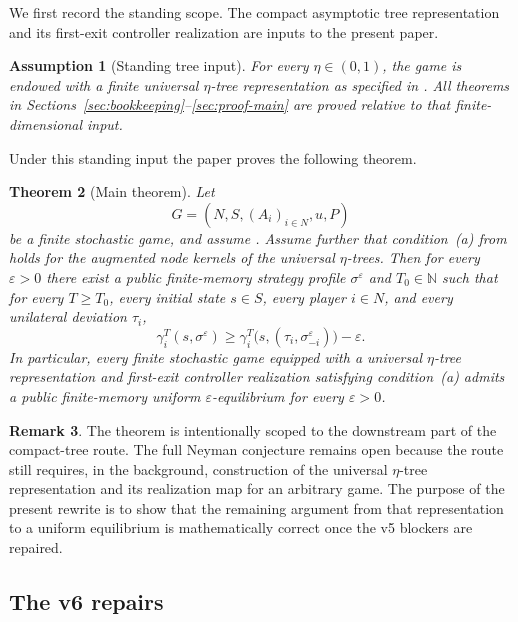 \documentclass[12pt]{article}
\newtheorem{theorem}{Theorem}[section]
\newtheorem{assumption}[theorem]{Assumption}
\theoremstyle{definition}
\newtheorem{remark}[theorem]{Remark}
\newcommand{\eps}{\varepsilon}
\newcommand{\N}{\mathbb{N}}
\newcommand{\1}{\mathbf{1}}
\begin{document}
We first record the standing scope. The compact asymptotic tree representation and
its first-exit controller realization are inputs to the present paper.

\begin{assumption}[Standing tree input]
\label{ass:tree-input}
For every $\eta\in(0,1)$, the game is endowed with a finite universal
$\eta$-tree representation as specified in
. All theorems in
Sections~\ref{sec:bookkeeping}--\ref{sec:proof-main} are proved relative to that
finite-dimensional input.
\end{assumption}

Under this standing input the paper proves the following theorem.

\begin{theorem}[Main theorem]
\label{thm:main}
Let
\[
G=(N,S,(A_i)_{i\in N},u,P)
\]
be a finite stochastic game, and assume . Assume further
that condition~\textnormal{(a)} from  holds for the augmented node
kernels of the universal $\eta$-trees. Then for every $\eps>0$ there exist a
public finite-memory strategy profile $\sigma^\eps$ and $T_0\in\N$ such that for
every $T\ge T_0$, every initial state $s\in S$, every player $i\in N$, and every
unilateral deviation $\tau_i$,
\[
\gamma_i^T(s,\sigma^\eps)
\ge
\gamma_i^T\bigl(s,(\tau_i,\sigma^\eps_{-i})\bigr)-\eps.
\]
In particular, every finite stochastic game equipped with a universal
$\eta$-tree representation and first-exit controller realization satisfying
condition~\textnormal{(a)} admits a public finite-memory uniform
$\eps$-equilibrium for every $\eps>0$.
\end{theorem}

\begin{remark}
The theorem is intentionally scoped to the downstream part of the compact-tree
route. The full Neyman conjecture remains open because the route still requires,
in the background, construction of the universal $\eta$-tree representation and
its realization map for an arbitrary game. The purpose of the present rewrite is
to show that the remaining argument from that representation to a uniform
equilibrium is mathematically correct once the v5 blockers are repaired.
\end{remark}

\subsection{The v6 repairs}
\end{document}
